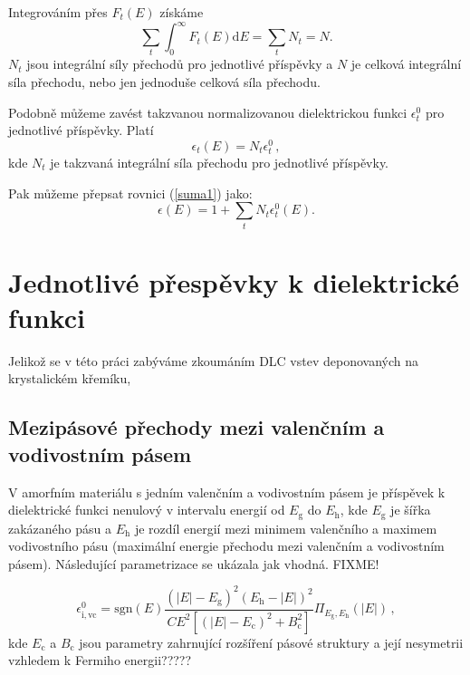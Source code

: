 Integrováním přes $F_t(E)$ získáme 
\begin{equation}
\label{definiceceelkovesily}
\sum_t \int_0^\infty F_t(E)\mathrm{d}E = \sum_t N_t = N \mathrm{.}
\end{equation}
$N_t$ jsou integrální síly přechodů pro jednotlivé příspěvky a $N$ je celková integrální síla přechodu, nebo jen jednoduše celková síla přechodu.  

Podobně můžeme zavést takzvanou normalizovanou dielektrickou funkci $\epsilon_t^0$ pro jednotlivé příspěvky. Platí 
\begin{equation}
\epsilon_t(E) = N_t \epsilon_t^0  \, \mathrm{,}
\end{equation}
kde $N_t$ je takzvaná integrální síla přechodu pro jednotlivé příspěvky.

Pak můžeme přepsat rovnici (\ref{suma1}) jako:
\begin{equation}
\epsilon (E) = 1 + \sum_t N_t \epsilon_t^0(E) \mathrm{.}
\end{equation}


\section{Jednotlivé přespěvky k dielektrické funkci}
Jelikož se v této práci zabýváme zkoumáním DLC vstev deponovaných na krystalickém křemíku, 

\subsection{Mezipásové přechody mezi valenčním a vodivostním pásem}
V amorfním materiálu s jedním valenčním a vodivostním pásem je příspěvek k dielektrické funkci nenulový v intervalu energií od $E_\mathrm{g}$ do $E_\mathrm{h}$, kde $E_\mathrm{g}$ je šířka zakázaného pásu a $E_\mathrm{h}$ je rozdíl energií mezi minimem valenčního a maximem vodivostního pásu (maximální energie přechodu mezi valenčním a vodivostním pásem). Následující parametrizace se ukázala jak vhodná. FIXME!

\begin{equation}
\label{valencvod}
\epsilon_\mathrm{i,vc}^0 = \mathrm{sgn}(E) \frac{(|E|- E_\mathrm{g})^2(E_\mathrm{h} - |E|)^2}{ C E^2 [(|E| - E_\mathrm{c})^2 + B_\mathrm{c}^2]} \Pi_{E_\mathrm{g},E_\mathrm{h}}(|E|) \, \mathrm{,}
\end{equation}
kde $E_\mathrm{c}$ a $B_\mathrm{c}$ jsou parametry zahrnující rozšíření pásové struktury a její nesymetrii vzhledem k Fermiho energii?????

